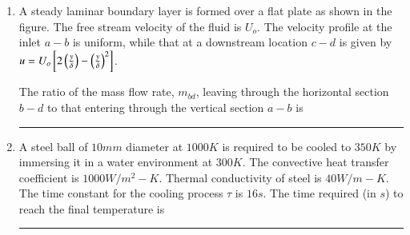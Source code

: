 \documentclass[journal]{IEEEtran}
\begin{document}
\begin{enumerate}
\item A steady laminar boundary layer is formed over a flat plate as shown in the figure. The free stream velocity of the fluid is $U_{o}$. The velocity profile at the inlet $a-b$ is uniform, while that at a downstream location $c-d$ is given by $u=U_{o}{}\left[2\left(\frac{y}{\delta}\right)-\left(\frac{y}{\delta}\right)^{2}\right]$.


The ratio of the mass flow rate, $m_{bd}$, leaving through the horizontal section $b-d$ to that entering through the vertical section $a-b$ is \rule{1cm}{0.15mm}


\item A steel ball of $10mm$ diameter at $1000K$ is required to be cooled to $350K$ by immersing it in a water environment at $300K$. The convective heat transfer coefficient is $1000 W/m^{2}-K$. Thermal conductivity of steel is $40W/m-K$. The time constant for the cooling process $\tau$ is $16s$. The time required (in $s$) to reach the final temperature is \rule{1cm}{0.15mm}
\end{enumerate}
\end{document}
